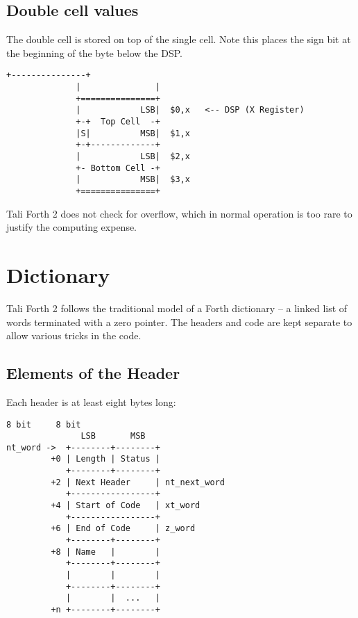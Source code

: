 \subsection{Double cell values}

The double cell is stored on top of the single cell.  Note this places the sign
bit at the beginning of the byte below the DSP.

\begin{lstlisting}[frame=single]
              +---------------+
              |               |  
              +===============+  
              |            LSB|  $0,x   <-- DSP (X Register) 
              +-+  Top Cell  -+         
              |S|          MSB|  $1,x
              +-+-------------+ 
              |            LSB|  $2,x
              +- Bottom Cell -+         
              |            MSB|  $3,x   
              +===============+ 
\end{lstlisting}

Tali Forth 2 does not check for overflow, which in normal
operation is too rare to justify the computing expense. 

\section{Dictionary}

Tali Forth 2 follows the traditional model of a Forth dictionary -- a linked list
of words terminated with a zero pointer. The headers and code are kept separate
to allow various tricks in the code.


\subsection{Elements of the Header}

Each header is at least eight bytes long:

\begin{lstlisting}[frame=single]
              8 bit     8 bit
               LSB       MSB
nt_word ->  +--------+--------+
         +0 | Length | Status |
            +--------+--------+
         +2 | Next Header     | nt_next_word
            +-----------------+
         +4 | Start of Code   | xt_word 
            +-----------------+
         +6 | End of Code     | z_word
            +--------+--------+
         +8 | Name   |        |
            +--------+--------+
            |        |        |
            +--------+--------+
            |        |  ...   |
         +n +--------+--------+
\end{lstlisting}

